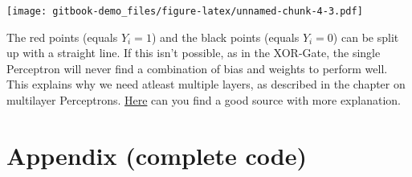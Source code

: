 \documentclass[
]{book}
\begin{document}
\texttt{[image: gitbook-demo\_files/figure-latex/unnamed-chunk-4-3.pdf]}

The red points (equals \(Y_i=1\)) and the black points (equals \(Y_i=0\)) can be split up with a straight line. If this isn't possible, as in the XOR-Gate, the single Perceptron will never find a combination of bias and weights to perform well. This explains why we need atleast multiple layers, as described in the chapter on multilayer Perceptrons. \href{https://towardsdatascience.com/how-neural-networks-solve-the-xor-problem-59763136bdd7}{Here} can you find a good source with more explanation.

\hypertarget{appendix-complete-code}{%
\section{Appendix (complete code)}\label{appendix-complete-code}}
\end{document}
